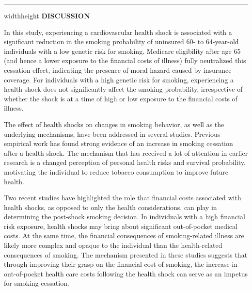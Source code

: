 \documentclass[12pt]{article}
\newlength{\seplinewidth}
\newlength{\seplinesep}
\newcommand*{\sepline}{%
	\par
	\vspace{\dimexpr\seplinesep+.5\parskip}%
	\cleaders\vbox{%
		\begingroup %
		\color{sepline}%
		\hrule width\linewidth height\seplinewidth
		\endgroup
	}\vskip\seplinewidth
	\vspace{\dimexpr\seplinesep-.5\parskip}%
}
\begin{document}
\color{sepline}%
\hrule width\linewidth height\seplinewidth
\vspace{2mm}
\normalsize
\vspace{1mm}
\color{Black}
\noindent \textbf{\large \textsf{DISCUSSION}}

\vspace{1mm}

In this study, experiencing a cardiovascular health shock is associated with a significant reduction in the smoking probability of uninsured 60- to 64-year-old individuals with a low genetic risk for smoking. Medicare eligibility after age 65 (and hence a lower exposure to the financial costs of illness) fully neutralized this cessation effect, indicating the presence of moral hazard caused by insurance coverage. For individuals with a high genetic risk for smoking, experiencing a health shock does not significantly affect the smoking probability, irrespective of whether the shock is at a time of high or low exposure to the financial costs of illness.


The effect of health shocks on changes in smoking behavior, as well as the underlying mechanisms, have been addressed in several studies.\cite{Wray1998,Smith2001,Clark2002,Falba2005,Khwaja2006spouse,Khwaja2006learn,Keenan2009,Sundmacher2012,Richards2014,Marti2017} Previous empirical work has found strong evidence of an increase in smoking cessation after a health shock.\cite{Wray1998,Clark2002,Falba2005,Keenan2009,Sundmacher2012,Richards2014,Marti2017} The mechanism that has received a lot of attention in earlier research is a changed perception of personal health risks and survival probability, motivating the individual to reduce tobacco consumption to improve future health.\cite{Smith2001,Clark2002,Khwaja2006spouse,Khwaja2006learn}

Two recent studies\cite{Richards2014,Marti2017} have highlighted the role that financial costs associated with health shocks, as opposed to only the health considerations, can play in determining the post-shock smoking decision. In individuals with a high financial risk exposure, health shocks may bring about significant out-of-pocket medical costs. At the same time, the financial consequences of smoking-related illness are likely more complex and opaque to the individual than the health-related consequences of smoking. The mechanism presented in these studies suggests that through improving their grasp on the financial cost of smoking, the increase in out-of-pocket health care costs following the health shock can serve as an impetus for smoking cessation.
\end{document}
